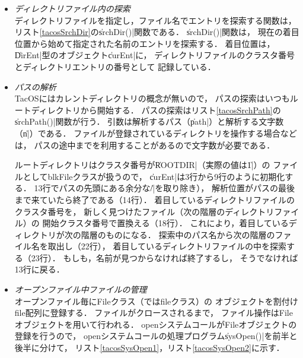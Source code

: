 \begin{itemize}
\item \emph{ディレクトリファイル内の探索} \\
  ディレクトリファイルを指定し，ファイル名でエントリを探索する関数は，
  リスト\ref{tacosSrchDir}の\|srchDir()|関数である．
  \|srchDir()|関数は，
  現在の着目位置から始めて指定された名前のエントリを探索する．
  着目位置は，\|DirEnt|型のオブジェクト\|curEnt|に，
  ディレクトリファイルのクラスタ番号とディレクトリエントリの番号として
  記録している．

  

\item \emph{パスの解析} \\
  TacOSにはカレントディレクトリの概念が無いので，
  パスの探索はいつもルートディレクトリから開始する．
  パスの探索はリスト\ref{tacosSrchPath}の\|srchPath()|関数が行う．
  引数は解析するパス（\|path|）と解析する文字数（\|n|）である．
  ファイルが登録されているディレクトリを操作する場合などは，
  パスの途中までを利用することがあるので文字数が必要である．
  
  

  ルートディレクトリはクラスタ番号が\|ROOTDIR|（実際の値は\|1|）の
  ファイルとしてblkFileクラスが扱うので，
  \|curEnt|は3行から9行のように初期化する．
  13行でパスの先頭にある余分な\|/|を取り除き），
  解析位置がパスの最後まで来ていたら終了である（14行）．
  着目しているディレクトリファイルのクラスタ番号を，
  新しく見つけたファイル（次の階層のディレクトリファイル）の
  開始クラスタ番号で置換える（18行）．
  これにより，着目しているディレクトリが次の階層のものになる．
  探索中のパス名から次の階層のファイル名を取出し（22行），
  着目しているディレクトリファイルの中を探索する（23行）．
  もしも，名前が見つからなければ終了するし，
  そうでなければ13行に戻る．

\item \emph{オープンファイル中ファイルの管理} \\
  オープンファイル毎にFileクラス（ではfileクラス）の
  オブジェクトを割付けfile配列に登録する．
  ファイルがクロースされるまで，
  ファイル操作はFileオブジェクトを用いて行われる．
  openシステムコールがFileオブジェクトの登録を行うので，
  openシステムコールの処理プログラム\|sysOpen()|を前半と後半に分けて，
  リスト\ref{tacosSysOpen1}，リスト\ref{tacosSysOpen2}に示す．


\end{itemize}
